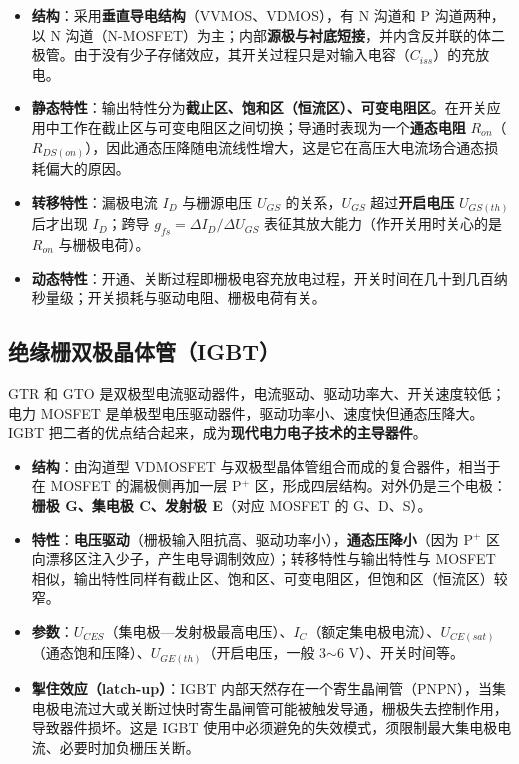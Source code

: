 \begin{itemize}
  \item \textbf{结构}：采用\textbf{垂直导电结构}（VVMOS、VDMOS），有 N 沟道和 P 沟道两种，以 N 沟道（N-MOSFET）为主；内部\textbf{源极与衬底短接}，并内含反并联的体二极管。由于没有少子存储效应，其开关过程只是对输入电容（$C_{iss}$）的充放电。
  \item \textbf{静态特性}：输出特性分为\textbf{截止区、饱和区（恒流区）、可变电阻区}。在开关应用中工作在截止区与可变电阻区之间切换；导通时表现为一个\textbf{通态电阻} $R_{on}$（$R_{DS(on)}$），因此通态压降随电流线性增大，这是它在高压大电流场合通态损耗偏大的原因。
  \item \textbf{转移特性}：漏极电流 $I_D$ 与栅源电压 $U_{GS}$ 的关系，$U_{GS}$ 超过\textbf{开启电压} $U_{GS(th)}$ 后才出现 $I_D$；跨导 $g_{fs}=\Delta I_D/\Delta U_{GS}$ 表征其放大能力（作开关用时关心的是 $R_{on}$ 与栅极电荷）。
  \item \textbf{动态特性}：开通、关断过程即栅极电容充放电过程，开关时间在几十到几百纳秒量级；开关损耗与驱动电阻、栅极电荷有关。
\end{itemize}


\subsection{绝缘栅双极晶体管（IGBT）}

GTR 和 GTO 是双极型电流驱动器件，电流驱动、驱动功率大、开关速度较低；电力 MOSFET 是单极型电压驱动器件，驱动功率小、速度快但通态压降大。IGBT 把二者的优点结合起来，成为\textbf{现代电力电子技术的主导器件}。

\begin{itemize}
  \item \textbf{结构}：由沟道型 VDMOSFET 与双极型晶体管组合而成的复合器件，相当于在 MOSFET 的漏极侧再加一层 P$^+$ 区，形成四层结构。对外仍是三个电极：\textbf{栅极 G、集电极 C、发射极 E}（对应 MOSFET 的 G、D、S）。
  \item \textbf{特性}：\textbf{电压驱动}（栅极输入阻抗高、驱动功率小），\textbf{通态压降小}（因为 P$^+$ 区向漂移区注入少子，产生电导调制效应）；转移特性与输出特性与 MOSFET 相似，输出特性同样有截止区、饱和区、可变电阻区，但饱和区（恒流区）较窄。
  \item \textbf{参数}：$U_{CES}$（集电极—发射极最高电压）、$I_C$（额定集电极电流）、$U_{CE(sat)}$（通态饱和压降）、$U_{GE(th)}$（开启电压，一般 3$\sim$6 V）、开关时间等。
  \item \textbf{掣住效应（latch-up）}：IGBT 内部天然存在一个寄生晶闸管（PNPN），当集电极电流过大或关断过快时寄生晶闸管可能被触发导通，栅极失去控制作用，导致器件损坏。这是 IGBT 使用中必须避免的失效模式，须限制最大集电极电流、必要时加负栅压关断。
\end{itemize}

